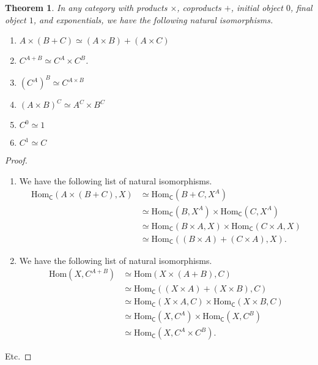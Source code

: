 \documentclass[a4paper,10pt]{scrreprt}
\newcommand{\Hom}{\mathrm{Hom}}
\theoremstyle{definition}
\theoremstyle{plain}
\newtheorem{theorem}{Theorem}[section]
\theoremstyle{remark}
\begin{document}
\begin{theorem}
  In any category with products $\times$, coproducts $+$, initial object $0$, final object $1$, and exponentials, we have the following natural isomorphisms.
  \begin{enumerate}
    \item $A \times (B + C) \simeq (A \times B) + (A \times C)$
    \item $C^{A + B} \simeq C^{A} \times C^{B}$.
    \item $(C^{A})^{B} \simeq C^{A \times B}$
    \item $(A \times B)^{C} \simeq A^{C} \times B^{C}$
    \item $C^{0} \simeq 1$
    \item $C^{1} \simeq C$
  \end{enumerate}
\end{theorem}
\begin{proof}
  $\,$
  \begin{enumerate}
    \item We have the following list of natural isomorphisms.
      \begin{align*}
        \Hom_{\mathsf{C}}(A \times (B + C), X) & \simeq \Hom_{\mathsf{C}}(B + C, X^{A}) \\
        & \simeq \Hom_{\mathsf{C}}(B, X^{A}) \times \Hom_{\mathsf{C}}(C, X^{A}) \\
        & \simeq \Hom_{\mathsf{C}}(B \times A, X) \times \Hom_{\mathsf{C}}(C \times A, X) \\
        & \simeq \Hom_{\mathsf{C}}((B \times A) + (C \times A), X).
      \end{align*}
    \item We have the following list of natural isomorphisms.
      \begin{align*}
        \Hom(X, C^{A + B}) & \simeq \Hom(X \times (A + B), C) \\
        & \simeq \Hom_{\mathsf{C}}((X \times A) + (X \times B), C) \\
        & \simeq \Hom_{\mathsf{C}}(X \times A, C) \times \Hom_{\mathsf{C}}(X \times B, C) \\
        & \simeq \Hom_{\mathsf{C}}(X, C^{A}) \times \Hom_{\mathsf{C}}(X, C^{B}) \\
        & \simeq \Hom_{\mathsf{C}}(X, C^{A} \times C^{B}).
      \end{align*}
  \end{enumerate}
  Etc.
\end{proof}
\end{document}
